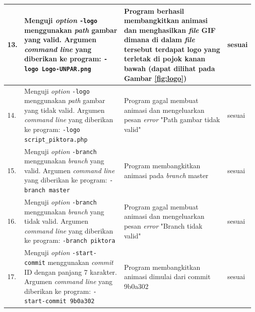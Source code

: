 \begin{table}[htbp]
\begin{tabular}{|p{0.3cm}|>{\raggedright} p{7 cm}| p{5.5 cm}| p{3 cm}|}
		13. & Menguji \textit{option} \texttt{-logo} menggunakan \textit{path} gambar yang valid. Argumen \textit{command line} yang diberikan ke program: \texttt{-logo Logo-UNPAR.png} & Program berhasil membangkitkan animasi dan menghasilkan \textit{file} GIF dimana di dalam \textit{file} tersebut terdapat logo yang terletak di pojok kanan bawah (dapat dilihat pada Gambar \ref{fig:logo}) & sesuai  \\ \hline
		14. & Menguji \textit{option} \texttt{-logo} menggunakan \textit{path} gambar yang tidak valid. Argumen \textit{command line} yang diberikan ke program: \texttt{-logo script\_piktora.php} & Program gagal membuat animasi dan mengeluarkan pesan \textit{error} "Path gambar tidak valid" & sesuai  \\ \hline
		15. & Menguji \textit{option} \texttt{-branch} menggunakan \textit{branch} yang valid. Argumen \textit{command line} yang diberikan ke program: \texttt{-branch master} & Program membangkitkan animasi pada \textit{branch} master & sesuai  \\ \hline
		16. & Menguji \textit{option} \texttt{-branch} menggunakan \textit{branch} yang tidak valid. Argumen \textit{command line} yang diberikan ke program: \texttt{-branch piktora}  & Program gagal membuat animasi dan mengeluarkan pesan \textit{error} "Branch tidak valid" & sesuai  \\ \hline
		17. & Menguji \textit{option} \texttt{-start-commit} menggunakan \textit{commit} ID dengan panjang 7 karakter. Argumen \textit{command line} yang diberikan ke program:  \texttt{-start-commit 9b0a302} & Program membangkitkan animasi dimulai dari commit 9b0a302 & sesuai  \\ \hline		
		
		
\end{tabular}
	\label{table:hasil_pengujian2}
\end{table}


